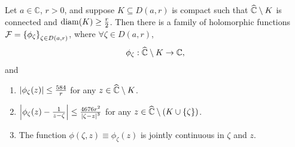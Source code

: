 \begin{proposition}\label{prop:complementbiholomorphism584r4767r2estimates}
    Let \(a\in\mathbb{C}\), \(r>0\), and suppose \(K\subseteq D(a,r)\) is compact such that \(\widehat{\mathbb{C}}\setminus K\) is connected and \(\operatorname{diam}(K)\geq\frac r2\). Then there is a family of holomorphic functions \(\mathcal{F}=\cbraces{\phi_\zeta}_{\zeta\in D(a,r)}\), where \(\forall\zeta\in D(a,r)\), \[\phi_\zeta:\widehat{\mathbb{C}}\setminus K\to\mathbb{C},\] and
    \begin{enumerate}
        \item \(\abs{\phi_\zeta(z)}\leq\frac{584}{r}\) for any \(z\in\widehat{\mathbb{C}}\setminus K\).\label{itm:complementbiholomorphism584r4767r2estimates_absolute584}
        \item \(\abs{\phi_\zeta(z)-\frac{1}{z-\zeta}}\leq\frac{4676r^2}{\abs{\zeta-z}^3}\) for any \(z\in\extcomplex\setminus\qty(K\cup\cbraces{\zeta})\).\label{itm:complementbiholomorphism584r4767r2estimates_absolutedifference4676}
        \item The function \(\phi(\zeta,z)\equiv\phi_\zeta(z)\) is jointly continuous in \(\zeta\) and \(z\).
    \end{enumerate}
\end{proposition}
